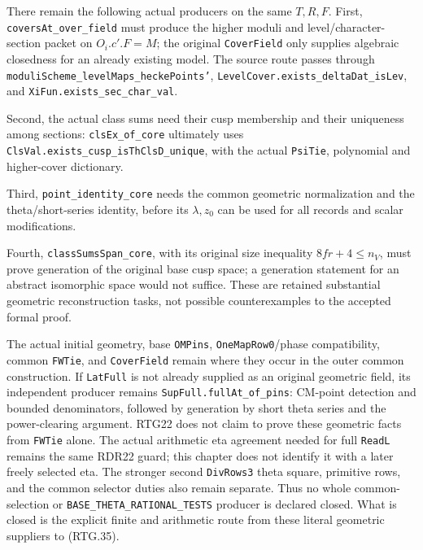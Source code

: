There remain the following actual producers on the same $T,R,F$.
First, \texttt{coversAt\_\allowbreak over\_\allowbreak field} must produce the higher moduli
and level/character-section packet on $O_i.c'.F=M$; the original
\texttt{CoverField} only supplies algebraic closedness for an already
existing model.  The source route passes through
\texttt{moduliScheme\_\allowbreak levelMaps\_\allowbreak heckePoints'},
\texttt{LevelCover.exists\_\allowbreak deltaDat\_\allowbreak isLev}, and
\texttt{XiFun.exists\_\allowbreak sec\_\allowbreak char\_\allowbreak val}.

Second, the actual class sums need their cusp membership and their
uniqueness among sections: \texttt{clsEx\_\allowbreak of\_\allowbreak core} ultimately uses
\texttt{ClsVal.\allowbreak exists\_\allowbreak cusp\_\allowbreak isThClsD\_\allowbreak unique}, with the actual
\texttt{PsiTie}, polynomial and higher-cover dictionary.

Third, \texttt{point\_\allowbreak identity\_\allowbreak core} needs the common geometric
normalization and the theta/short-series identity, before its
$\lambda,z_0$ can be used for all records and scalar modifications.

Fourth, \texttt{classSumsSpan\_\allowbreak core}, with its original size inequality
$8fr+4\le n_V$, must prove generation of the original base cusp space;
a generation statement for an abstract
isomorphic space would not suffice.  These are retained substantial
geometric reconstruction tasks, not possible counterexamples to the
accepted formal proof.

The actual initial geometry, base \texttt{OMPins},
\texttt{OneMapRow0}/phase compatibility, common \texttt{FWTie}, and
\texttt{CoverField} remain where they occur in the outer common
construction.  If \texttt{LatFull} is not already supplied as an original
geometric field, its independent producer remains
\texttt{SupFull.fullAt\_\allowbreak of\_\allowbreak pins}: CM-point detection and bounded
denominators, followed by generation by short theta series and the
power-clearing argument.  RTG22 does not claim to prove these geometric
facts from \texttt{FWTie} alone.  The actual arithmetic eta agreement
needed for full \texttt{ReadL} remains the same RDR22 guard; this chapter
does not identify it with a later freely selected eta.  The stronger
second \texttt{DivRows3} theta square, primitive rows, and the common
selector duties also remain separate.  Thus no whole common-selection
or \texttt{BASE\_\allowbreak THETA\_\allowbreak RATIONAL\_\allowbreak TESTS} producer is declared closed.
What is closed is the explicit finite and arithmetic route from these
literal geometric suppliers to (RTG.35).
